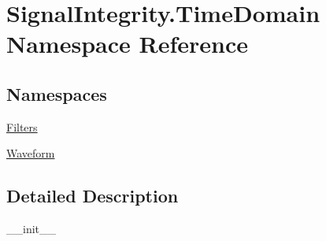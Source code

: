 \hypertarget{namespaceSignalIntegrity_1_1TimeDomain}{}\section{Signal\+Integrity.\+Time\+Domain Namespace Reference}
\label{namespaceSignalIntegrity_1_1TimeDomain}
\subsection*{Namespaces}
\begin{DoxyCompactItemize}
\item 
 \hyperlink{namespaceSignalIntegrity_1_1TimeDomain_1_1Filters}{Filters}
\item 
 \hyperlink{namespaceSignalIntegrity_1_1TimeDomain_1_1Waveform}{Waveform}
\end{DoxyCompactItemize}


\subsection{Detailed Description}
\begin{DoxyVerb}__init__\end{DoxyVerb}
 
